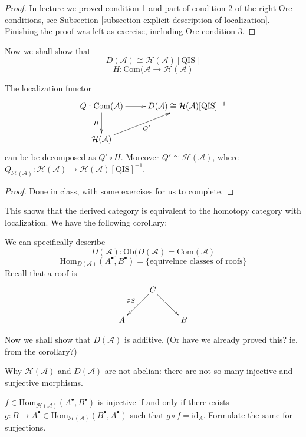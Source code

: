 \begin{proof}
In lecture we proved condition 1 and part of condition 2 of the right Ore
conditions, see Subsection
\ref{subsection-explicit-description-of-localization}. Finishing the proof was
left as exercise, including Ore condition 3.
\end{proof}

\bigskip\noindent
Now we shall show that
$$
D(\mathcal{A})\cong \mathcal{H}(\mathcal{A})[\text{QIS}]
$$
$$
H:\text{Com}(\mathcal{A}\to \mathcal{H}(\mathcal{A})
$$
\begin{proposition}
\label{proposition-localization-functor}
The localization functor
$$
\xymatrix{
Q:\text{Com}(\mathcal{A})\ar[d]_H\ar[r]
& D(\mathcal{A})\cong\mathcal{H}(\mathcal{A})[\text{QIS}]^{-1}\\
\mathcal{H}(\mathcal{A})\ar[ur]_{Q'}
}
$$
can be be decomposed as $Q' \circ H$. Moreover $Q' \cong
\mathcal{H}(\mathcal{A})$, where
$Q_{\mathcal{H}(\mathcal{A})}:\mathcal{H}(\mathcal{A}) \to
\mathcal{H}(\mathcal{A})[\text{QIS}]^{-1}$.
\end{proposition}

\begin{proof}
Done in class, with some exercises for us to complete.
\end{proof}

This shows that the derived category is equivalent to the homotopy category with
localization. We have the following corollary:

\begin{lemma}
\label{lemma-}
We can specifically describe
$$
D(\mathcal{A}): \text{Ob}(D(\mathcal{A}) = \text{Com}(\mathcal{A})
$$
$$
\text{Hom}_{D(\mathcal{A})}(A^{\bullet},B^{\bullet})
=\{\text{equivelnce classes of roofs}\}
$$
Recall that a roof is
$$
\xymatrix{
& C\ar[dl]_{\in S}\ar[dr]\\
A& & B
}
$$
\end{lemma}

\bigskip\noindent
Now we shall show that $D(\mathcal{A})$ is additive. (Or have we already proved
this? ie. from the corollary?)

\bigskip\noindent
Why $\mathcal{H}(\mathcal{A})$ and $D(\mathcal{A})$ are not abelian: there are
not so many injective and surjective morphisms.

\begin{exercise}
\label{exercise-no-injective-surjective-morphisms-in-derived-categories}
$f \in \text{Hom}_{\mathcal{H}(\mathcal{A})} (A^{\bullet},B^{\bullet})$ is
injective if and only if there exists  $g: B \to A^{\bullet} \in
\text{Hom}_{\mathcal{H}(\mathcal{A})} (B^{\bullet},A^{\bullet})$ such that $g
\circ f=\text{id}_A$. Formulate the same for surjections.
\end{exercise}

